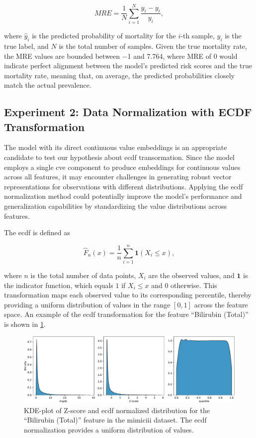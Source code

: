 \begin{equation}
    \label{eq:mre}
    MRE = \frac{1}{N} \sum_{i=1}^{N} \frac{\hat{y}_i - y_i}{y_i},
\end{equation}

where \( \hat{y}_i \) is the predicted probability of mortality for the \( i \)-th sample, \( y_i \) is the true label, and \( N \) is the total number of samples. Given the true mortality rate, the MRE values are bounded between \num{-1} and \num{7.764}, where MRE of \num{0} would indicate perfect alignment between the model's predicted risk scores and the true mortality rate, meaning that, on average, the predicted probabilities closely match the actual prevalence.

\subsection{Experiment 2: Data Normalization with ECDF Transformation}

The  model with its direct continuous value embeddings is an appropriate candidate to test our hypothesis about \gls{ecdf} transormation. Since the model employs a single \gls{cve} component to produce embeddings for continuous values across all features, it may encounter challenges in generating robust vector representations for observations with different distributions. Applying the \gls{ecdf} normalization method could potentially improve the model's performance and generalization capabilities by standardizing the value distributions across features\cite{emmert2022mathematical}.

The \gls{ecdf} is defined as

\[
    \hat{F}_n(x) = \frac{1}{n} \sum_{i=1}^{n} \mathbf{1}(X_i \leq x),
\]

where \(n\) is the total number of data points, \(X_i\) are the observed values, and \(\mathbf{1}\) is the indicator function, which equals \(1\) if \(X_i \leq x\) and \(0\) otherwise. This transformation maps each observed value to its corresponding percentile, thereby providing a uniform distribution of values in the range \([0, 1]\) across the feature space. An example of the \gls{ecdf} transformation for the feature ``Bilirubin (Total)'' is shown in \cref{fig:transforms_bilirubin}.

\begin{figure}
    \centering
    \includegraphics[width=\textwidth]{./figures/transforms_Bilirubin__Total_}
    \caption{KDE-plot of Z-score and \gls{ecdf} normalized distribution for the ``Bilirubin (Total)''  feature in the \gls{mimiciii} dataset. The \gls{ecdf} normalization provides a uniform distribution of values.}
    \label{fig:transforms_bilirubin}
\end{figure}



